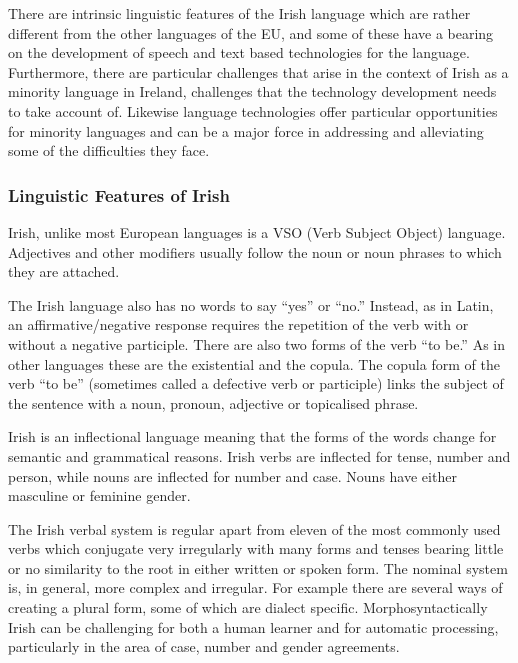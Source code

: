 \begin{multicols}{2}
There are intrinsic linguistic features of the Irish language which are rather different from the other languages of the EU, and some of these have a bearing on the development of speech and text based technologies for the language. Furthermore,  there are particular challenges that arise in the context of Irish as a minority language in Ireland, challenges that the technology development needs to take account of. Likewise language technologies offer particular opportunities for minority languages and can be a major force in addressing and alleviating some of the difficulties they face.

\subsubsection{Linguistic Features of Irish}

Irish, unlike most European languages is a VSO (Verb Subject Object) language. Adjectives and other modifiers usually follow the noun or noun phrases to which they are attached.


The Irish language also has no words to say ``yes'' or ``no.'' Instead, as in Latin, an affirmative/negative response requires the repetition of the verb with or without a negative participle. There are also two forms of the verb ``to be.'' As in other languages these are the existential and the copula. The copula form of the verb ``to be'' (sometimes called a defective verb or participle) links the subject of the sentence with a noun, pronoun, adjective or topicalised phrase.

Irish is an inflectional language meaning that the forms of the words change for semantic and grammatical reasons. Irish verbs are inflected for tense, number and person, while nouns are inflected for number and case.  Nouns have either masculine or feminine gender.

The Irish verbal system is regular apart from eleven of the most commonly used verbs which conjugate very irregularly with many forms and tenses bearing little or no similarity to the root in either written or spoken form. The nominal system is, in general, more complex and irregular. For example there are several ways of creating a plural form, some of which are dialect specific. Morphosyntactically Irish can be challenging for both a human learner and for automatic processing, particularly in the area of case, number and gender agreements.


\end{multicols}
